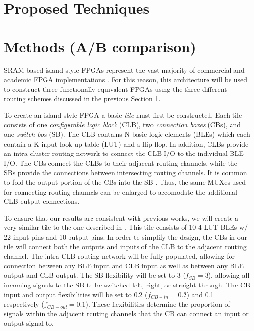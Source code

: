 \documentclass[twoside,twocolumn]{article}
\begin{document}

\section{Proposed Techniques}\label{sec:proposed}




\section{Methods (A/B comparison)}
SRAM-based island-style FPGAs represent the vast majority of commercial and academic
FPGA implementations \cite{farooq_fpga_2012}. For this reason, this architecture 
will be used to construct three functionally equivalent FPGAs using the three different
routing schemes discussed in the previous Section \ref{sec:proposed}. 

To create an island-style FPGA a basic \textit{tile} must first be constructed. 
Each tile consists of one \textit{configurable logic block} (CLB), 
two \textit{connection boxes} (CBs), and one \textit{switch box} (SB). 
The CLB contains N basic logic elements (BLEs) which each contain a K-input 
look-up-table (LUT) and a flip-flop. In addition, CLBs provide an intra-cluster 
routing network to connect the CLB I/O to the individual BLE I/O. The CBs connect
the CLBs to their adjacent routing channels, while the SBs provide the connections
between intersecting routing channels. It is common to fold the output portion of 
the CBs into the SB \cite{chen_efficient_2010}. Thus, the same MUXes used for
connecting routing channels can be enlarged to accomodate the additional 
CLB output connections.

To ensure that our results are consistent with previous works, we
will create a very similar tile to the one described in \cite{chen_efficient_2010}. 
This tile consists of 10 4-LUT BLEs w/ 22 input pins and 10 output pins.
In order to simplify the design, the CBs in our tile will connect both
the outputs and inputs of the CLB to the adjacent routing channel.
The intra-CLB routing network will be fully populated, allowing for connection 
between any BLE input and CLB input as well as between any BLE output and CLB output.
The SB flexibility will be set to 3 ($f_{SB} = 3$), allowing all 
incoming signals to the SB to be switched left, right, or straight through. 
The CB input and output flexibilities will be set to 0.2 ($f_{CB-in} = 0.2$) 
and 0.1 respectively ($f_{CB-out} = 0.1$). These flexibilities determine the 
proportion of signals within the adjacent routing channels that the CB can 
connect an input or output signal to.
\end{document}
